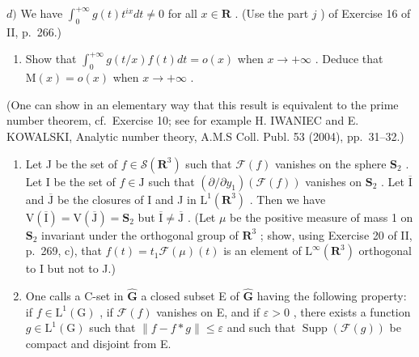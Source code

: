 \(d)\) We have \(\int_{0}^{+\infty} g(t)t^{ix} dt \neq 0\) for all \(x \in \mathbf{R}\) . (Use the part \(j\) ) of Exercise 16 of II, p.~266.)

\begin{enumerate}
\def\labelenumi{\alph{enumi})}
\setcounter{enumi}{4}
\tightlist
\item
  Show that \(\int_0^{+\infty} g(t / x)f(t)dt = o(x)\) when \(x \to +\infty\) . Deduce that \(\mathrm{M}(x) = o(x)\) when \(x \to +\infty\) .
\end{enumerate}

(One can show in an elementary way that this result is equivalent to the prime number theorem, cf.~Exercise 10; see for example H. IWANIEC and E. KOWALSKI, Analytic number theory, A.M.S Coll. Publ. 53 (2004), pp.~31--32.)

\begin{enumerate}
\def\labelenumi{\arabic{enumi})}
\setcounter{enumi}{11}
\item
  Let J be the set of \(f \in \mathcal{S}(\mathbf{R}^3)\) such that \(\mathcal{F}(f)\) vanishes on the sphere \(\mathbf{S}_2\) . Let I be the set of \(f \in \mathrm{J}\) such that \((\partial/\partial y_1)(\mathcal{F}(f))\) vanishes on \(\mathbf{S}_2\) . Let \(\overline{\mathrm{I}}\) and \(\overline{\mathrm{J}}\) be the closures of I and J in \(\mathrm{L}^1(\mathbf{R}^3)\) . Then we have \(\mathrm{V}(\overline{\mathrm{I}}) = \mathrm{V}(\overline{\mathrm{J}}) = \mathbf{S}_2\) but \(\overline{\mathrm{I}} \neq \overline{\mathrm{J}}\) . (Let \(\mu\) be the positive measure of mass 1 on \(\mathbf{S}_2\) invariant under the orthogonal group of \(\mathbf{R}^3\) ; show, using Exercise 20 of II, p.~269, c), that \(f(t) = t_1\mathcal{F}(\mu)(t)\) is an element of \(\mathrm{L}^\infty(\mathbf{R}^3)\) orthogonal to I but not to J.)
\item
  One calls a C-set in \(\widehat{\mathbf{G}}\) a closed subset E of \(\widehat{\mathbf{G}}\) having the following property: if \(f\in \mathrm{L}^{1}(\mathrm{G})\) , if \(\mathcal{F}(f)\) vanishes on E, and if \(\varepsilon >0\) , there exists a function \(g\in \mathrm{L}^{1}(\mathrm{G})\) such that \(\| f - f*g\| \leqslant \varepsilon\) and such that \(\operatorname {Supp}(\mathcal{F}(g))\) be compact and disjoint from E.
\end{enumerate}

